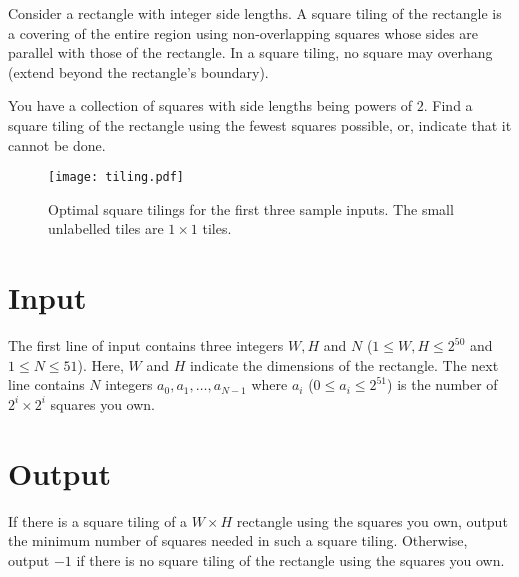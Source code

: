 
Consider a rectangle with integer side lengths.
A square tiling of the rectangle is a covering of the entire region
using non-overlapping squares whose sides are parallel with those of the rectangle. 
In a square tiling, no square may overhang (extend beyond the rectangle's boundary).

You have a collection of squares with side lengths being powers of $2$.
Find a square tiling of the rectangle using the fewest squares possible, or,
indicate that it cannot be done.

\begin{figure}[h]
  \begin{center}
  \texttt{[image: tiling.pdf]}
  \caption{Optimal square tilings for the first three sample inputs. The small unlabelled tiles are $1 \times 1$ tiles.}
  \end{center}
\end{figure}


\section*{Input}

The first line of input contains three integers $W, H$ and $N$ ($1 \leq W,H \leq 2^{50}$ and $1 \leq N \leq 51$).
Here, $W$ and $H$ indicate the dimensions of the rectangle. The next line contains $N$ integers $a_0, a_1, \ldots, a_{N-1}$
where $a_i$ ($0 \leq a_i \leq 2^{51}$) is the number of $2^i \times 2^i$ squares you own.

\section*{Output}
If there is a square tiling of a $W \times H$ rectangle using the squares you own, output
the minimum number of squares needed in such a square tiling. Otherwise, output $-1$ if there is no square tiling
of the rectangle using the squares you own.
